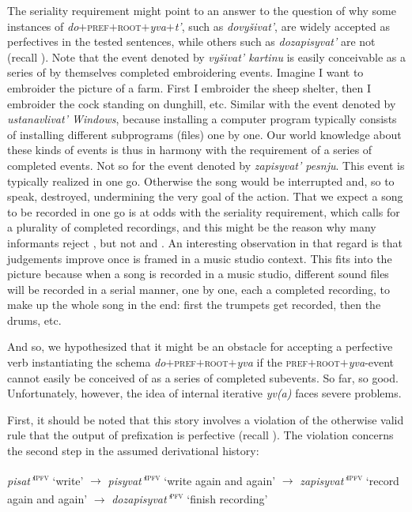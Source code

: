 \documentclass[output=paper,
colorlinks,
citecolor=brown,
newtxmath
]{langscibook}
\begin{document}
The seriality requirement might point to an answer to the question of why some instances of \textit{do}$+$\textsc{pref}$+$\textsc{root}$+$\textit{yva}$+$\textit{t'}, such as \textit{dovyšivat'}, are widely accepted as perfectives in the tested sentences, while others such as \textit{dozapisyvat'} are not (recall ). Note that the event denoted by \textit{vyšivat' kartinu} is easily conceivable as a series of by themselves completed embroidering events. Imagine I want to embroider the picture of a farm. First I embroider the sheep shelter, then I embroider the cock standing on dunghill, etc. Similar with the event denoted by \textit{ustanavlivat' Windows}, because installing a computer program typically consists of installing different subprograms (files) one by one. Our world knowledge about these kinds of events is thus in harmony with the requirement of a series of completed events. Not so for the event denoted by \textit{zapisyvat' pesnju}. This event is typically realized in one go. Otherwise the song would be interrupted and, so to speak, destroyed, undermining the very goal of the action. That we expect a song to be recorded in one go is at odds with the seriality requirement, which calls for a plurality of completed recordings, and this might be the reason why many informants reject , but not  and . An interesting observation in that regard is that judgements improve once  is framed in a music studio context. This fits into the picture because when a song is recorded in a music studio, different sound files will be recorded in a serial manner, one by one, each a completed recording, to make up the whole song in the end: first the trumpets get recorded, then the drums, etc.

And so, we hypothesized that it might be an obstacle for accepting a perfective verb instantiating the schema \textit{do}$+$\textsc{pref}$+$\textsc{root}$+$\textit{yva} if the \textsc{pref}$+$\textsc{root}$+$\textit{yva}-event cannot easily be conceived of as a series of completed subevents. So far, so good. Unfortunately, however, the idea of internal iterative \textit{yv(a)} faces severe problems.

First, it should be noted that this story involves a violation of the otherwise valid rule that the output of prefixation is perfective (recall ). The violation concerns the second step in the assumed derivational history:

\ea\label{dhx}
\textit{pisat'}\textsuperscript{\textsc{ipfv}} `write' $\rightarrow$ \textit{pisyvat'}\textsuperscript{\textsc{ipfv}}  `write again and again' $\rightarrow$ \textit{zapisyvat'}\textsuperscript{\textsc{ipfv}} `record again and again' $\rightarrow$ \textit{dozapisyvat'}\textsuperscript{\textsc{pfv}} `finish recording'
\z
\end{document}
